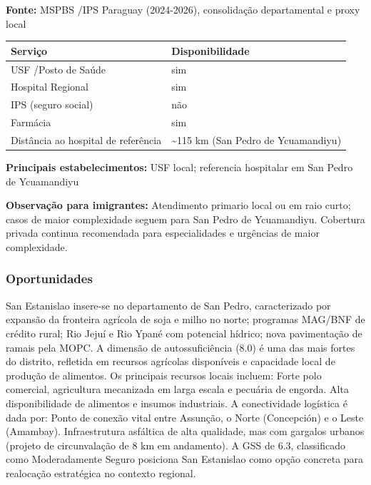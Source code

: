 \textbf{Fonte:} MSPBS /\allowbreak  IPS Paraguay (2024-2026), consolidação
departamental e proxy local

{\def\LTcaptype{none} %
\begin{longtable}[]{@{}
  >{\raggedright\arraybackslash}p{}
  >{\raggedright\arraybackslash}p{}@{}}
\toprule\noalign{}
\begin{minipage}[b]{\linewidth}\raggedright
Serviço
\end{minipage} & \begin{minipage}[b]{\linewidth}\raggedright
Disponibilidade
\end{minipage} \\
\midrule\noalign{}
\endhead
\bottomrule\noalign{}
\endlastfoot
USF /\allowbreak  Posto de Saúde & sim \\
Hospital Regional & sim \\
IPS (seguro social) & não \\
Farmácia & sim \\
Distância ao hospital de referência & \textasciitilde115 km (San Pedro
de Ycuamandiyu) \\
\end{longtable}
}

\textbf{Principais estabelecimentos:} USF local; referencia hospitalar
em San Pedro de Ycuamandiyu

\textbf{Observação para imigrantes:} Atendimento primario local ou em
raio curto; casos de maior complexidade seguem para San Pedro de
Ycuamandiyu. Cobertura privada continua recomendada para especialidades
e urgências de maior complexidade.
\newpage

\subsubsection*{Oportunidades}\label{oport-san-estanislao-0208}
San Estanislao insere-se no departamento de San Pedro, caracterizado por expansão da fronteira agrícola de soja e milho no norte; programas MAG/BNF de crédito rural; Rio Jejuí e Rio Ypané com potencial hídrico; nova pavimentação de ramais pela MOPC. A dimensão de autossuficiência (8.0) é uma das mais fortes do distrito, refletida em recursos agrícolas disponíveis e capacidade local de produção de alimentos. Os principais recursos locais incluem: Forte polo comercial, agricultura mecanizada em larga escala e pecuária de engorda. Alta disponibilidade de alimentos e insumos industriais. A conectividade logística é dada por: Ponto de conexão vital entre Assunção, o Norte (Concepción) e o Leste (Amambay). Infraestrutura asfáltica de alta qualidade, mas com gargalos urbanos (projeto de circunvalação de 8 km em andamento). A GSS de 6.3, classificado como Moderadamente Seguro posiciona San Estanislao como opção concreta para realocação estratégica no contexto regional.

